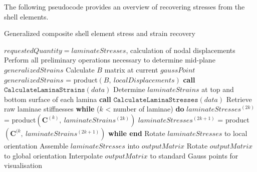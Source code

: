 The following pseudocode provides an overview of recovering stresses from the shell elements.

\begin{algorithm}
	\onehalfspacing
	\caption{Generalized composite shell element stress and strain recovery}
	\label{general composite shell stress pseudocode}
	\begin{algorithmic}[1]
		\Require $requestedQuantity = laminateStresses$, calculation of nodal displacements
		\State Perform all preliminary operations necessary to determine mid-plane $generalizedStrains$
		\State \hspace{\algorithmicindent}Calculate $B$ matrix at current $gaussPoint$
		\State $generalizedStrains$ = product$(B,\ localDisplacements)$
		\State \textbf{call} $\texttt{CalculateLaminaStrains}(data)$
		\State \hspace{\algorithmicindent}Determine $laminateStrains$ at top and bottom surface of each lamina 
		\State \textbf{call} $\texttt{CalculateLaminaStresses}(data)$
		\State \hspace{\algorithmicindent}Retrieve raw laminae stiffnesses
		\State \hspace{\algorithmicindent}\textbf{while} ($k$ < number of laminae) \textbf{do}
		\State \hspace{\algorithmicindent} \hspace{\algorithmicindent}$laminateStresses^{(2k)}$ = product$(\mathbf{C}^{(k)},\ laminateStrains^{(2k)})$
		\State \hspace{\algorithmicindent} \hspace{\algorithmicindent}$laminateStresses^{(2k+1)}$ = product$(\mathbf{C}^{(k},\ laminateStrains^{(2k+1)})$
		\State \hspace{\algorithmicindent}\textbf{while end}
		\State Rotate $laminateStresses$ to local orientation
		\EndIf
		\State Assemble $laminateStresses$ into $outputMatrix$
		\State Rotate $outputMatrix$ to global orientation
		\EndIf
		\State Interpolate $outputMatrix$ to standard Gauss points for visualisation
		\EndWhile
	\end{algorithmic}
\end{algorithm}

